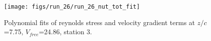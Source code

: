 \begin{figure}[H]
\centering
\texttt{[image: figs/run\_26/run\_26\_nut\_tot\_fit]}
\caption{Polynomial fits of reynolds stress and velocity gradient terms at $z/c$=7.75, $V_{free}$=24.86, station 3.}
\label{fig:run_26_nut_tot_fit}
\end{figure}


